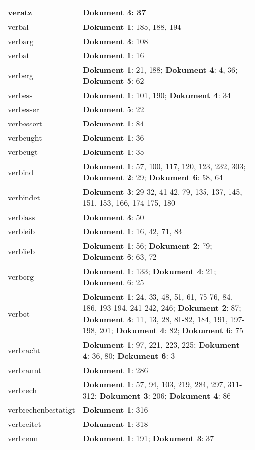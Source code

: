 \documentclass[a5paper]{article}
\begin{document}
\begin{longtable}[l]{|l|p{3in}|}
veratz & \textbf{Dokument 3}: 37 \\
\hline
verbal & \textbf{Dokument 1}: 185, 188, 194 \\
\hline
verbarg & \textbf{Dokument 3}: 108 \\
\hline
verbat & \textbf{Dokument 1}: 16 \\
\hline
verberg & \textbf{Dokument 1}: 21, 188; \textbf{Dokument 4}: 4, 36; \textbf{Dokument 5}: 62 \\
\hline
verbess & \textbf{Dokument 1}: 101, 190; \textbf{Dokument 4}: 34 \\
\hline
verbesser & \textbf{Dokument 5}: 22 \\
\hline
verbessert & \textbf{Dokument 1}: 84 \\
\hline
verbeught & \textbf{Dokument 1}: 36 \\
\hline
verbeugt & \textbf{Dokument 1}: 35 \\
\hline
verbind & \textbf{Dokument 1}: 57, 100, 117, 120, 123, 232, 303; \textbf{Dokument 2}: 29; \textbf{Dokument 6}: 58, 64 \\
\hline
verbindet & \textbf{Dokument 3}: 29-32, 41-42, 79, 135, 137, 145, 151, 153, 166, 174-175, 180 \\
\hline
verblass & \textbf{Dokument 3}: 50 \\
\hline
verbleib & \textbf{Dokument 1}: 16, 42, 71, 83 \\
\hline
verblieb & \textbf{Dokument 1}: 56; \textbf{Dokument 2}: 79; \textbf{Dokument 6}: 63, 72 \\
\hline
verborg & \textbf{Dokument 1}: 133; \textbf{Dokument 4}: 21; \textbf{Dokument 6}: 25 \\
\hline
verbot & \textbf{Dokument 1}: 24, 33, 48, 51, 61, 75-76, 84, 186, 193-194, 241-242, 246; \textbf{Dokument 2}: 87; \textbf{Dokument 3}: 11, 13, 28, 81-82, 184, 191, 197-198, 201; \textbf{Dokument 4}: 82; \textbf{Dokument 6}: 75 \\
\hline
verbracht & \textbf{Dokument 1}: 97, 221, 223, 225; \textbf{Dokument 4}: 36, 80; \textbf{Dokument 6}: 3 \\
\hline
verbrannt & \textbf{Dokument 1}: 286 \\
\hline
verbrech & \textbf{Dokument 1}: 57, 94, 103, 219, 284, 297, 311-312; \textbf{Dokument 3}: 206; \textbf{Dokument 4}: 86 \\
\hline
verbrechenbestatigt & \textbf{Dokument 1}: 316 \\
\hline
verbreitet & \textbf{Dokument 1}: 318 \\
\hline
verbrenn & \textbf{Dokument 1}: 191; \textbf{Dokument 3}: 37 \\

\end{longtable}
\end{document}
